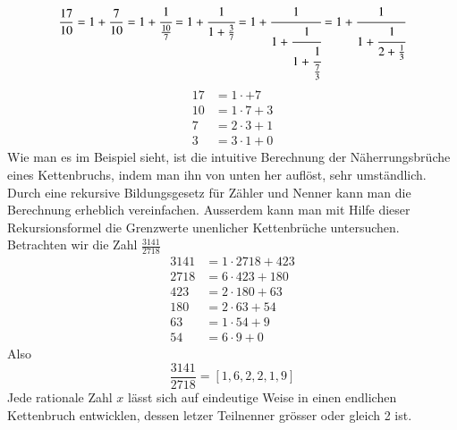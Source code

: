 \begin{equation}
\frac{17}{10}
=
1 + \frac{7}{10}
=
1 + \cfrac{1}{\frac{10}{7}}
=
1 + \cfrac{1}{1+\frac{3}{7}}
=
1 + \cfrac{1}{1+\cfrac{1}{1+\cfrac{1}{\frac{7}{3}}}}
=
1 + \cfrac{1}{1+\cfrac{1}{2+\frac{1}{3}}}
\end{equation}
\begin{align*}
17 &= 1\cdot + 7 \\
10 &= 1\cdot 7 + 3 \\
7 &= 2\cdot 3 + 1 \\
3 &= 3\cdot 1 + 0
\end{align*}
Wie man es im Beispiel sieht, ist die intuitive Berechnung der
Näherrungsbrüche eines Kettenbruchs, indem man ihn von unten her
auflöst, sehr umständlich. Durch eine rekursive Bildungsgesetz für
Zähler und Nenner kann man die Berechnung erheblich vereinfachen.
Ausserdem kann man mit Hilfe dieser Rekursionsformel die Grenzwerte
unenlicher Kettenbrüche untersuchen.
Betrachten wir die Zahl $\frac{3141}{2718}$
\begin{align*}
3141 &= 1\cdot 2718 + 423 \\
2718 &= 6\cdot 423 + 180 \\
423 &= 2\cdot 180 + 63 \\
180 &= 2\cdot 63 + 54 \\
63 &= 1\cdot 54 + 9 \\
54 &= 6\cdot 9 + 0
\end{align*}
Also
\begin{equation}
\frac{3141}{2718} = [1,6,2,2,1,9]
\end{equation}
Jede rationale Zahl $x$ lässt sich auf eindeutige Weise in einen
endlichen Kettenbruch entwicklen, dessen letzer Teilnenner grösser
oder gleich 2 ist.